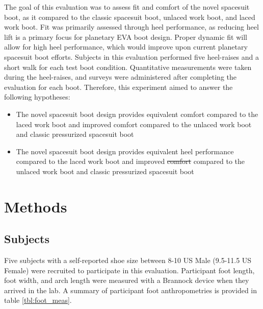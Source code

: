 \documentclass[defaultstyle,11pt]{thesis}
\providecommand{\tightlist}{%
  \setlength{\itemsep}{0pt}\setlength{\parskip}{0pt}}
\providecommand{\DIFaddtex}[1]{{\protect\color{blue}\uwave{#1}}} %
\providecommand{\DIFdeltex}[1]{{\protect\color{red}\sout{#1}}}                      %
\providecommand{\DIFaddbegin}{} %
\providecommand{\DIFaddend}{} %
\providecommand{\DIFdelbegin}{} %
\providecommand{\DIFdelend}{} %
\providecommand{\DIFadd}[1]{\texorpdfstring{\DIFaddtex{#1}}{#1}} %
\providecommand{\DIFdel}[1]{\texorpdfstring{\DIFdeltex{#1}}{}} %
\newcommand{\DIFscaledelfig}{0.5}
\newlength{\DIFdelgraphicswidth} %
\newlength{\DIFdelgraphicsheight} %
\newcommand{\DIFaddincludegraphics}[2][]{{\color{blue}\fbox{\DIFOincludegraphics[#1]{#2}}}} %
\newcommand{\DIFdelincludegraphics}[2][]{%
\sbox{\DIFdelgraphicsbox}{\DIFOincludegraphics[#1]{#2}}%
\settoboxwidth{\DIFdelgraphicswidth}{\DIFdelgraphicsbox} %
\settoboxtotalheight{\DIFdelgraphicsheight}{\DIFdelgraphicsbox} %
\scalebox{\DIFscaledelfig}{%
\parbox[b]{\DIFdelgraphicswidth}{\usebox{\DIFdelgraphicsbox}\\[-\baselineskip] \rule{\DIFdelgraphicswidth}{0em}}\llap{\resizebox{\DIFdelgraphicswidth}{\DIFdelgraphicsheight}{%
\setlength{\unitlength}{\DIFdelgraphicswidth}%
\begin{picture}(1,1)%
\thicklines\linethickness{2pt} %
{\color[rgb]{1,0,0}\put(0,0){\framebox(1,1){}}}%
{\color[rgb]{1,0,0}\put(0,0){\line( 1,1){1}}}%
{\color[rgb]{1,0,0}\put(0,1){\line(1,-1){1}}}%
\end{picture}%
}\hspace*{3pt}}} %
} %
\DeclareRobustCommand{\DIFaddbegin}{\DIFOaddbegin \let\includegraphics\DIFaddincludegraphics} %
\DeclareRobustCommand{\DIFaddend}{\DIFOaddend \let\includegraphics\DIFOincludegraphics} %
\DeclareRobustCommand{\DIFdelbegin}{\DIFOdelbegin \let\includegraphics\DIFdelincludegraphics} %
\DeclareRobustCommand{\DIFdelend}{\DIFOaddend \let\includegraphics\DIFOincludegraphics} %
\begin{document}
The goal of this evaluation was to assess fit and comfort of the novel spacesuit boot, as it compared to the classic spacesuit boot, unlaced work boot, and laced work boot.
Fit was primarily assessed through heel performance, as reducing heel lift is a primary focus for planetary EVA boot design.
Proper dynamic fit will allow for high heel performance, which would improve upon current planetary spacesuit boot efforts.
Subjects in this evaluation performed five heel-raises and a short walk for each test boot condition.
Quantitative measurements were taken during the heel-raises, and surveys were administered after completing the evaluation for each boot.
Therefore, this experiment aimed to answer the following hypotheses:

\begin{itemize}
\tightlist
\item
  The novel spacesuit boot design provides equivalent comfort compared to the laced work boot and improved comfort compared to the unlaced work boot and classic pressurized spacesuit boot
\item
  The novel spacesuit boot design provides equivalent heel performance compared to the laced work boot and improved \DIFdelbegin \DIFdel{comfort }\DIFdelend \DIFaddbegin \DIFadd{heel performance }\DIFaddend compared to the unlaced work boot and classic pressurized spacesuit boot
\end{itemize}

\hypertarget{methods-3}{%
\section{Methods}\label{methods-3}}

\hypertarget{subjects-1}{%
\subsection{Subjects}\label{subjects-1}}

Five subjects with a self-reported shoe size between 8-10 US Male (9.5-11.5 US Female) were recruited to participate in this evaluation.
Participant foot length, foot width, and arch length were measured with a Brannock device when they arrived in the lab.
A summary of participant foot anthropometries is provided in table \ref{tbl:foot_meas}.
\end{document}
